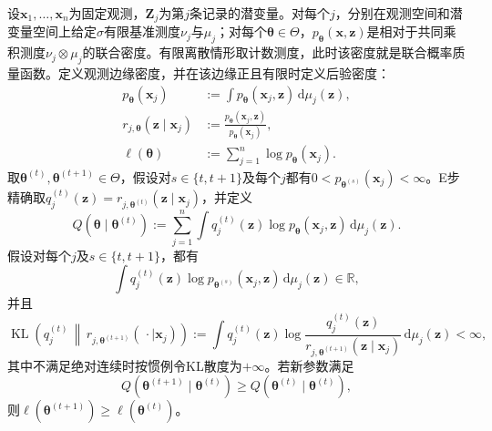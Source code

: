 \begin{theorem}[EM的观测似然单调性]
  \label{thm:pgm-parameter-learning-em-monotonicity}
  设$\bm{x}_1,\ldots,\bm{x}_n$为固定观测，$\bm{Z}_j$为第$j$条记录的潜变量。对每个$j$，分别在观测空间和潜变量空间上给定$\sigma$有限基准测度$\nu_j$与$\mu_j$；对每个$\bm{\theta}\in\Theta$，$p_{\bm{\theta}}(\bm{x},\bm{z})$是相对于共同乘积测度$\nu_j\otimes\mu_j$的联合密度。有限离散情形取计数测度，此时该密度就是联合概率质量函数。定义观测边缘密度，并在该边缘正且有限时定义后验密度：
  \[
    \begin{aligned}
      p_{\bm{\theta}}(\bm{x}_j)
        &\mathrel{:=}\int
          p_{\bm{\theta}}(\bm{x}_j,\bm{z})\,
          \mathrm{d}\mu_j(\bm{z}),\\
      r_{j,\bm{\theta}}(\bm{z}\mid\bm{x}_j)
        &\mathrel{:=}
          \frac{p_{\bm{\theta}}(\bm{x}_j,\bm{z})}
               {p_{\bm{\theta}}(\bm{x}_j)},\\
      \ell(\bm{\theta})
        &\mathrel{:=}\sum_{j=1}^n
          \log p_{\bm{\theta}}(\bm{x}_j).
    \end{aligned}
  \]
  取$\bm{\theta}^{(t)},\bm{\theta}^{(t+1)}\in\Theta$，假设对$s\in\{t,t+1\}$及每个$j$都有$0<p_{\bm{\theta}^{(s)}}(\bm{x}_j)<\infty$。E步精确取$q_j^{(t)}(\bm{z})=r_{j,\bm{\theta}^{(t)}}(\bm{z}\mid\bm{x}_j)$，并定义
  \[
    Q(\bm{\theta}\mid\bm{\theta}^{(t)})
      \mathrel{:=}\sum_{j=1}^n\int
        q_j^{(t)}(\bm{z})
        \log p_{\bm{\theta}}(\bm{x}_j,\bm{z})\,
        \mathrm{d}\mu_j(\bm{z}).
  \]
  假设对每个$j$及$s\in\{t,t+1\}$，都有
  \[
    \int q_j^{(t)}(\bm{z})
      \log p_{\bm{\theta}^{(s)}}(\bm{x}_j,\bm{z})\,
      \mathrm{d}\mu_j(\bm{z})\in\mathbb{R},
  \]
  并且
  \[
    \operatorname{KL}\!\left(
      q_j^{(t)}\,\middle\|\,
      r_{j,\bm{\theta}^{(t+1)}}(\,\cdot\mid\bm{x}_j)
    \right)
    \mathrel{:=}\int q_j^{(t)}(\bm{z})
      \log\frac{q_j^{(t)}(\bm{z})}
                    {r_{j,\bm{\theta}^{(t+1)}}(\bm{z}\mid\bm{x}_j)}
      \,\mathrm{d}\mu_j(\bm{z})
    <\infty,
  \]
  其中不满足绝对连续时按惯例令KL散度为$+\infty$。若新参数满足
  \[
    Q(\bm{\theta}^{(t+1)}\mid\bm{\theta}^{(t)})
    \geq Q(\bm{\theta}^{(t)}\mid\bm{\theta}^{(t)}),
  \]
  则$\ell(\bm{\theta}^{(t+1)})\geq\ell(\bm{\theta}^{(t)})$。
\end{theorem}

